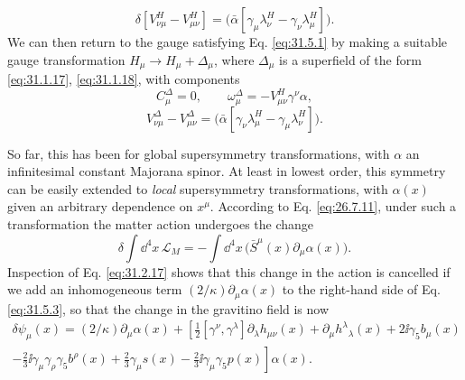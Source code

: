 \begin{equation}
  \delta[V_{\nu\mu}^H-V_{\mu\nu}^H]
  =\bigl(\bar\alpha
    [\gamma_\mu\lambda_\nu^H-\gamma_\nu\lambda_\mu^H]\bigr).
  \tag{31.5.8}\label{eq:31.5.8}
\end{equation}
We can then return to the gauge satisfying Eq. \eqref{eq:31.5.1} by
making a suitable gauge transformation \(H_\mu\longrightarrow
H_\mu+\Delta_\mu\), where \(\Delta_\mu\) is a superfield of the form
\eqref{eq:31.1.17}, \eqref{eq:31.1.18}, with components
\begin{equation}
  C_\mu^\Delta=0,\qquad
  \omega_\mu^\Delta=-V_{\mu\nu}^H\gamma^\nu\alpha,
  \tag{31.5.9}\label{eq:31.5.9}
\end{equation}
\begin{equation}
  V_{\nu\mu}^\Delta-V_{\mu\nu}^\Delta
  =\bigl(\bar\alpha
    [\gamma_\nu\lambda_\mu^H-\gamma_\mu\lambda_\nu^H]\bigr).
  \tag{31.5.10}\label{eq:31.5.10}
\end{equation}

So far, this has been for global supersymmetry transformations, with
\(\alpha\) an infinitesimal constant Majorana spinor. At least in lowest
order, this symmetry can be easily extended to \emph{local}
supersymmetry transformations, with \(\alpha(x)\) given an arbitrary
dependence on \(x^\mu\). According to Eq. \eqref{eq:26.7.11}, under such
a transformation the matter action undergoes the change
\begin{equation}
  \delta\int \dd^4x\,\mathcal{L}_M
  =-\int \dd^4x\,
    \bigl(\bar S^\mu(x)\partial_\mu\alpha(x)\bigr).
  \tag{31.5.11}\label{eq:31.5.11}
\end{equation}
Inspection of Eq. \eqref{eq:31.2.17} shows that this change in the action
is cancelled if we add an inhomogeneous term
\((2/\kappa)\partial_\mu\alpha(x)\) to the right-hand side of
Eq. \eqref{eq:31.5.3}, so that the change in the gravitino field is now
\begin{multline}
  \delta\psi_\mu(x)
  =(2/\kappa)\partial_\mu\alpha(x)
  +\left[
      \frac{1}{2}[\gamma^\nu,\gamma^\lambda]
        \partial_\lambda h_{\mu\nu}(x)
      +\partial_\mu h^\lambda{}_\lambda(x)
      +2\ii\gamma_5b_\mu(x)\right.\\
  \left.
      -\frac{2}{3}\ii\gamma_\mu\gamma_\rho\gamma_5b^\rho(x)
      +\frac{2}{3}\gamma_\mu s(x)
      -\frac{2}{3}\ii\gamma_\mu\gamma_5p(x)
    \right]\alpha(x).
  \tag{31.5.12}\label{eq:31.5.12}
\end{multline}

